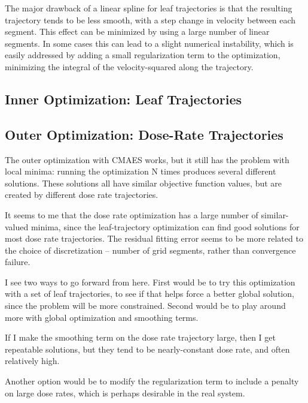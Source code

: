 The major drawback of a linear spline for leaf trajectories is that the resulting trajectory tends
to be less smooth, with a step change in velocity between each segment. This effect can be minimized
by using a large number of linear segments. In some cases this can lead to a slight numerical
instability, which is easily addressed by adding a small regularization term to the optimization,
minimizing the integral of the velocity-squared along the trajectory.


\subsection{Inner Optimization:  Leaf Trajectories}



\subsection{Outer Optimization:  Dose-Rate Trajectories}


The outer optimization with CMAES works, but it still has the problem with local minima:
running the optimization N times produces several different solutions.
These solutions all have similar objective function values, but are created by different
dose rate trajectories.

It seems to me that the dose rate optimization has a large number of similar-valued minima,
since the leaf-trajectory optimization can find good solutions for most dose rate trajectories.
The residual fitting error seems to be more related to the choice of discretization -- number of
grid segments, rather than convergence failure.

I see two ways to go forward from here. First would be to try this optimization with a set of
leaf trajectories, to see if that helps force a better global solution, since the problem will
be more constrained. Second would be to play around more with global optimization and smoothing
terms.

If I make the smoothing term on the dose rate trajectory large, then I get repeatable solutions,
but they tend to be nearly-constant dose rate, and often relatively high.

Another option would be to modify the regularization term to include a  penalty on large
dose rates, which is perhaps desirable in the real system.

